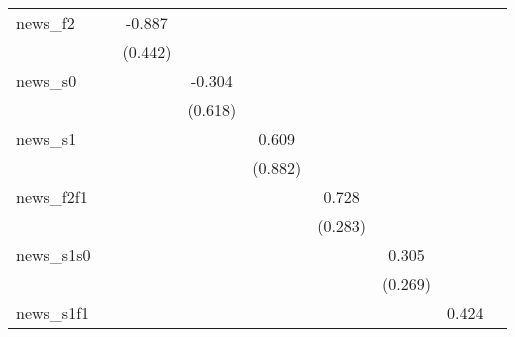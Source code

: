 {\begin{tabular}{l*{8}{c}}
\addlinespace
news\_f2     &                     &      -0.887\sym{**} &                     &                     &                     &                     &                     &                     \\
            &                     &     (0.442)         &                     &                     &                     &                     &                     &                     \\
\addlinespace
news\_s0     &                     &                     &      -0.304         &                     &                     &                     &                     &                     \\
            &                     &                     &     (0.618)         &                     &                     &                     &                     &                     \\
\addlinespace
news\_s1     &                     &                     &                     &       0.609         &                     &                     &                     &                     \\
            &                     &                     &                     &     (0.882)         &                     &                     &                     &                     \\
\addlinespace
news\_f2f1   &                     &                     &                     &                     &       0.728\sym{**} &                     &                     &                     \\
            &                     &                     &                     &                     &     (0.283)         &                     &                     &                     \\
\addlinespace
news\_s1s0   &                     &                     &                     &                     &                     &       0.305         &                     &                     \\
            &                     &                     &                     &                     &                     &     (0.269)         &                     &                     \\
\addlinespace
news\_s1f1   &                     &                     &                     &                     &                     &                     &       0.424         &                     \\

\end{tabular}}
